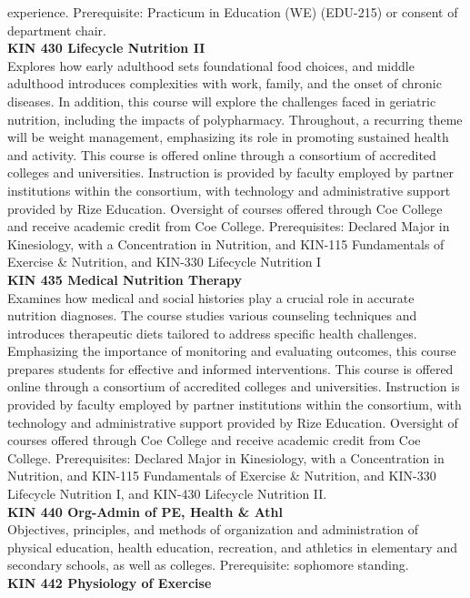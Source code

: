 \documentclass[
  letterpaper,
]{scrbook}
\begin{document}
experience. Prerequisite: Practicum in Education (WE) (EDU-215) or
consent of department chair.\\
\textbf{KIN 430 Lifecycle Nutrition II}\\
Explores how early adulthood sets foundational food choices, and middle
adulthood introduces complexities with work, family, and the onset of
chronic diseases. In addition, this course will explore the challenges
faced in geriatric nutrition, including the impacts of polypharmacy.
Throughout, a recurring theme will be weight management, emphasizing its
role in promoting sustained health and activity. This course is offered
online through a consortium of accredited colleges and universities.
Instruction is provided by faculty employed by partner institutions
within the consortium, with technology and administrative support
provided by Rize Education. Oversight of courses offered through Coe
College and receive academic credit from Coe College. Prerequisites:
Declared Major in Kinesiology, with a Concentration in Nutrition, and
KIN-115 Fundamentals of Exercise \& Nutrition, and KIN-330 Lifecycle
Nutrition I\\
\textbf{KIN 435 Medical Nutrition Therapy}\\
Examines how medical and social histories play a crucial role in
accurate nutrition diagnoses. The course studies various counseling
techniques and introduces therapeutic diets tailored to address specific
health challenges. Emphasizing the importance of monitoring and
evaluating outcomes, this course prepares students for effective and
informed interventions. This course is offered online through a
consortium of accredited colleges and universities. Instruction is
provided by faculty employed by partner institutions within the
consortium, with technology and administrative support provided by Rize
Education. Oversight of courses offered through Coe College and receive
academic credit from Coe College. Prerequisites: Declared Major in
Kinesiology, with a Concentration in Nutrition, and KIN-115 Fundamentals
of Exercise \& Nutrition, and KIN-330 Lifecycle Nutrition I, and KIN-430
Lifecycle Nutrition II.\\
\textbf{KIN 440 Org-Admin of PE, Health \& Athl}\\
Objectives, principles, and methods of organization and administration
of physical education, health education, recreation, and athletics in
elementary and secondary schools, as well as colleges. Prerequisite:
sophomore standing.\\
\textbf{KIN 442 Physiology of Exercise}\\
\end{document}

